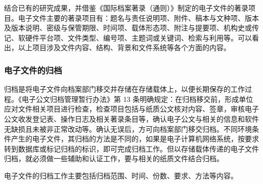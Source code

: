     结合已有的研究成果，并借鉴《国际档案著录（通则）》制定的电子文件的著录项目。电子文件主要的著录项目有：题名与责任说明项、附件、稿本与文种项、版本及版本说明、密级与保管期限、时间项、载体形态项、附注与提要项、机构史或传记、软硬件平台项、文件类型、编号项、主题词或关键词、检索与利用等。可以看出，以上项目涉及文件内容、结构、背景和文件系统等各个方面的内容。

    \subsubsection {电子文件的归档}

    归档是将电子文件向档案部门移交并存储在存储载体上，以便长期保存的工作过程。《电子公文归档管理暂行办法》第 13 条明确规定：在归档移交前，形成单位应对文件相关项目进行检查，检查项目包括与纸质公文核对内容、签章，审核电子公文收发登记表、操作日志及相关著录条目等，确认电子公文与相关的信息和软件无缺损且未被非正常改动等。确认无误后，方可向档案部门移交归档。不同环境条件产生的电子文件，其归档的方法是不同的，如果是电子计算机网络系统，按要求转到数据库或标记归档的标识，即可完成归档工作。但以存储载体传递的电子文件归档，就必须做一些辅助和认证工作，要与相关的纸质文件结合归档。

    电子文件的归档工作主要包括归档范围、时间、份数、要求、方法等内容。

